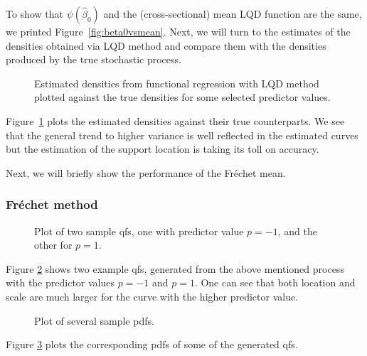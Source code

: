 To show that $\psi(\hat{\beta}_0)$ and the (cross-sectional) mean LQD function are the
same, we printed Figure~\ref{fig:beta0vsmean}. Next, we will turn to the estimates of
the densities obtained via LQD method and compare them with the densities produced by
the true stochastic process.
\begin{figure}[h!]
    \centering
    \resizebox{1\textwidth}{!}{}
    \caption[Comparison: estimated vs. true densities --- LQD]{Estimated densities from
    functional regression with LQD method plotted against the true densities for some
    selected predictor values.}
    \label{fig:func_est_vs_true}
\end{figure}
Figure~\ref{fig:func_est_vs_true} plots the estimated densities against their true
counterparts. We see that the general trend to higher variance is well reflected in the
estimated curves but the estimation of the support location is taking its toll on
accuracy.

Next, we will briefly show the performance of the Fréchet mean.
\subsubsection{Fréchet method}
\label{sec:app_frechet}

\begin{figure}[h!]
    \centering
    \resizebox{1\textwidth}{!}{}
    \caption[Two sample qfs]{Plot of two sample qfs, one with predictor value $p = -1$,
    and the other for $p = 1$.}
    \label{fig:1stlastqf}
\end{figure}

Figure \ref{fig:1stlastqf} shows two example qfs, generated from the above mentioned
process with the predictor values $p=-1$ and $p=1$. One can see that both location and
scale are much larger for the curve with the higher predictor value.

\begin{figure}[h!]
    \centering
    \resizebox{1\textwidth}{!}{}
    \caption[Several sampled pdfs]{Plot of several sample pdfs.}
    \label{fig:some_densities}
\end{figure}

Figure \ref{fig:some_densities} plots the corresponding pdfs of some of the generated qfs.

